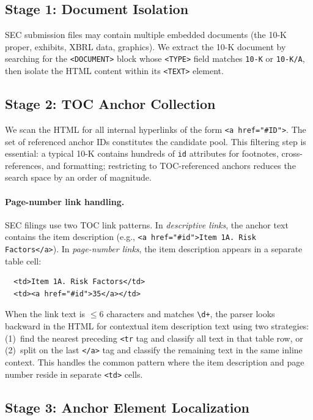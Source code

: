 \documentclass[11pt,a4paper]{article}
\begin{document}
\subsection{Stage 1: Document Isolation}

SEC submission files may contain multiple embedded documents (the 10-K proper, exhibits, XBRL data, graphics). We extract the 10-K document by searching for the \texttt{<DOCUMENT>} block whose \texttt{<TYPE>} field matches \texttt{10-K} or \texttt{10-K/A}, then isolate the HTML content within its \texttt{<TEXT>} element.

\subsection{Stage 2: TOC Anchor Collection}

We scan the HTML for all internal hyperlinks of the form \texttt{<a href="\#ID">}. The set of referenced anchor IDs constitutes the candidate pool. This filtering step is essential: a typical 10-K contains hundreds of \texttt{id} attributes for footnotes, cross-references, and formatting; restricting to TOC-referenced anchors reduces the search space by an order of magnitude.

\paragraph{Page-number link handling.} SEC filings use two TOC link patterns. In \emph{descriptive links}, the anchor text contains the item description (e.g., \texttt{<a href="\#id">Item~1A.\ Risk Factors</a>}). In \emph{page-number links}, the item description appears in a separate table cell:

\begin{verbatim}
  <td>Item 1A. Risk Factors</td>
  <td><a href="#id">35</a></td>
\end{verbatim}

\noindent
When the link text is $\leq 6$ characters and matches \verb|\d+|, the parser looks backward in the HTML for contextual item description text using two strategies: (1)~find the nearest preceding \texttt{<tr} tag and classify all text in that table row, or (2)~split on the last \texttt{</a>} tag and classify the remaining text in the same inline context. This handles the common pattern where the item description and page number reside in separate \texttt{<td>} cells.

\subsection{Stage 3: Anchor Element Localization}
\end{document}
